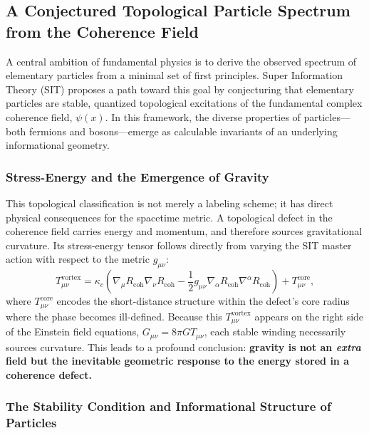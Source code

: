 \subsection{A Conjectured Topological Particle Spectrum from the Coherence Field}

A central ambition of fundamental physics is to derive the observed spectrum of elementary particles from a minimal set of first principles. Super Information Theory (SIT) proposes a path toward this goal by conjecturing that elementary particles are stable, quantized topological excitations of the fundamental complex coherence field, $\psi(x)$. In this framework, the diverse properties of particles---both fermions and bosons---emerge as calculable invariants of an underlying informational geometry.

\subsubsection{Stress-Energy and the Emergence of Gravity}

This topological classification is not merely a labeling scheme; it has direct physical consequences for the spacetime metric. A topological defect in the coherence field carries energy and momentum, and therefore sources gravitational curvature. Its stress-energy tensor follows directly from varying the SIT master action with respect to the metric $g_{\mu\nu}$:
\begin{equation}
    T_{\mu\nu}^{\text{vortex}} = \kappa_{c}\left(\nabla_{\mu} R_{\text{coh}}\nabla_{\nu} R_{\text{coh}} - \frac{1}{2} g_{\mu\nu}\nabla_{\alpha} R_{\text{coh}}\nabla^{\alpha} R_{\text{coh}}\right) + T_{\mu\nu}^{\text{core}},
\end{equation}
where $T_{\mu\nu}^{\text{core}}$ encodes the short-distance structure within the defect's core radius where the phase becomes ill-defined. Because this $T_{\mu\nu}^{\text{vortex}}$ appears on the right side of the Einstein field equations, $G_{\mu\nu} = 8\pi G T_{\mu\nu}$, each stable winding necessarily sources curvature. This leads to a profound conclusion: \textbf{gravity is not an \emph{extra} field but the inevitable geometric response to the energy stored in a coherence defect.}

\subsubsection{The Stability Condition and Informational Structure of Particles}

